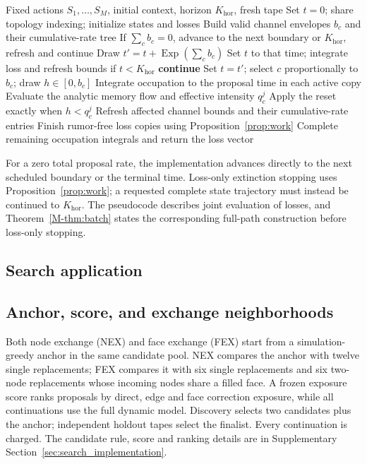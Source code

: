 \documentclass[preprint,11pt,sort&compress]{elsarticle}
\begin{document}
\begin{algorithm}[t]
\caption{Predictable-envelope portfolio evaluation}
\label{alg:batch}
\begin{algorithmic}[1]
\Require Fixed actions $S_1,\ldots,S_M$, initial context, horizon $K_{\mathrm{hor}}$, fresh tape
\State Set $t=0$; share topology indexing; initialize states and losses
\State Build valid channel envelopes $b_c$ and their cumulative-rate tree
\State If $\sum_c b_c=0$, advance to the next boundary or $K_{\mathrm{hor}}$, refresh and continue
\State Draw $t'=t+\operatorname{Exp}(\sum_c b_c)$
\State Set $t$ to that time; integrate loss and refresh bounds if $t<K_{\mathrm{hor}}$
\State \textbf{continue}
\EndIf
\State Set $t=t'$; select $c$ proportionally to $b_c$; draw $h\in[0,b_c]$
\State Integrate occupation to the proposal time in each active copy
\State Evaluate the analytic memory flow and effective intensity $q_c^j$
\State Apply the reset exactly when $h<q_c^j$
\EndFor
\State Refresh affected channel bounds and their cumulative-rate entries
\State Finish rumor-free loss copies using Proposition~\ref{prop:work}
\EndWhile
\State Complete remaining occupation integrals and return the loss vector
\end{algorithmic}
\end{algorithm}
For a zero total proposal rate, the implementation advances directly to the next scheduled boundary or the terminal time. Loss-only extinction stopping uses Proposition~\ref{prop:work}; a requested complete state trajectory must instead be continued to $K_{\mathrm{hor}}$. The pseudocode describes joint evaluation of losses, and Theorem~\ref{M-thm:batch} states the corresponding full-path construction before loss-only stopping.


\subsection{Search application}
\label{sec:search}
\subsection{Anchor, score, and exchange neighborhoods}
Both node exchange (NEX) and face exchange (FEX) start from a simulation-greedy anchor in the same candidate pool. NEX compares the anchor with twelve single replacements; FEX compares it with six single replacements and six two-node replacements whose incoming nodes share a filled face. A frozen exposure score ranks proposals by direct, edge and face correction exposure, while all continuations use the full dynamic model. Discovery selects two candidates plus the anchor; independent holdout tapes select the finalist. Every continuation is charged. The candidate rule, score and ranking details are in Supplementary Section~\ref{sec:search_implementation}.
\end{document}
